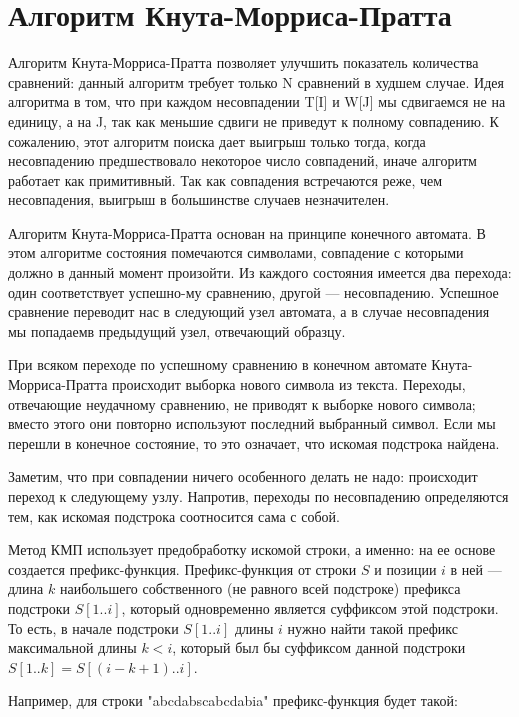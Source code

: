 \documentclass[a4paper, 14pt]{report}
\begin{document}
\section {Алгоритм Кнута-Морриса-Пратта} 

Алгоритм Кнута-Морриса-Пратта позволяет улучшить показатель количества сравнений: данный алгоритм требует только N сравнений в худшем случае.
	Идея алгоритма в том, что при каждом несовпадении T[I] и W[J] мы сдвигаемся не на единицу, а на J, так как меньшие сдвиги не приведут к полному совпадению. К сожалению, этот алгоритм поиска дает выигрыш только тогда, когда несовпадению предшествовало некоторое число совпадений, иначе алгоритм работает как примитивный. Так как совпадения встречаются реже, чем несовпадения, выигрыш в большинстве случаев незначителен.

Алгоритм  Кнута-Морриса-Пратта  основан  на  принципе  конечного автомата.     В  этом  алгоритме  состояния  помечаются  символами,  совпадение  с  которыми  должно  в  данный  момент  произойти.  Из каждого  состояния  имеется  два перехода:  один соответствует  успешно-му сравнению,  другой — несовпадению.
Успешное сравнение переводит нас  в  следующий  узел  автомата,  а  в  случае  несовпадения  мы  попадаемв  предыдущий  узел,   отвечающий  образцу.

При  всяком  переходе  по  успешному  сравнению  в  конечном  автомате Кнута-Морриса-Пратта  происходит  выборка  нового  символа  из  текста.   Переходы,  отвечающие  неудачному  сравнению,  не  приводят  к  выборке  нового  символа;  вместо  этого  они  повторно  используют  последний выбранный  символ.  Если  мы перешли  в  конечное состояние,  то это означает,  что  искомая  подстрока  найдена.

Заметим,  что  при  совпадении  ничего  особенного  делать  не  надо:  происходит  переход  к  следующему  узлу. Напротив,  переходы  по  несовпадению  определяются  тем,  как  искомая подстрока соотносится  сама  с  собой.

Метод КМП использует предобработку искомой строки, а именно: на ее основе создается префикс-функция.
Префикс-функция от строки $S$ и позиции $i$ в ней — длина $k$  наибольшего собственного (не равного всей подстроке) префикса подстроки $S[1.. i]$, который одновременно является суффиксом этой подстроки.
То есть, в начале подстроки $S[1.. i]$ длины $i$ нужно найти такой префикс максимальной длины $k < i$, который был бы суффиксом данной подстроки $S[1..k]=S[(i-k+1)..i]$.

Например, для строки "abcdabscabcdabia" префикс-функция будет такой:
\end{document}

